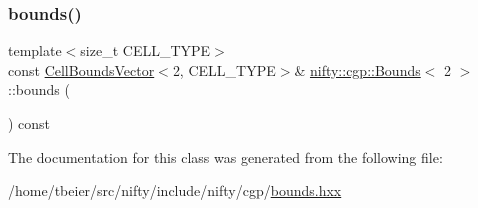 \subsubsection{\texorpdfstring{bounds()}{bounds()}}
{\footnotesize\ttfamily template$<$size\+\_\+t C\+E\+L\+L\+\_\+\+T\+Y\+PE$>$ \\
const \hyperlink{classnifty_1_1cgp_1_1CellBoundsVector}{Cell\+Bounds\+Vector}$<$2, C\+E\+L\+L\+\_\+\+T\+Y\+PE$>$\& \hyperlink{classnifty_1_1cgp_1_1Bounds}{nifty\+::cgp\+::\+Bounds}$<$ 2 $>$\+::bounds (\begin{DoxyParamCaption}{ }\end{DoxyParamCaption}) const\hspace{0.3cm}{\ttfamily [inline]}}



The documentation for this class was generated from the following file\+:\begin{DoxyCompactItemize}
\item 
/home/tbeier/src/nifty/include/nifty/cgp/\hyperlink{bounds_8hxx}{bounds.\+hxx}\end{DoxyCompactItemize}
